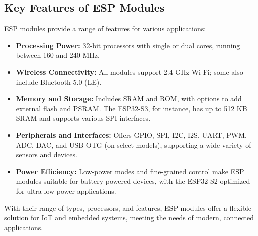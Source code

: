 \subsection{Key Features of ESP Modules}

ESP modules provide a range of features for various applications:

\begin{itemize}
	\item \textbf{Processing Power:} 32-bit processors with single or dual cores, running between 160 and 240 MHz.
	
	\item \textbf{Wireless Connectivity:} All modules support 2.4 GHz Wi-Fi; some also include Bluetooth 5.0 (LE).
	
	\item \textbf{Memory and Storage:} Includes SRAM and ROM, with options to add external flash and PSRAM. The ESP32-S3, for instance, has up to 512 KB SRAM and supports various SPI interfaces.
	
	\item \textbf{Peripherals and Interfaces:} Offers GPIO, SPI, I2C, I2S, UART, PWM, ADC, DAC, and USB OTG (on select models), supporting a wide variety of sensors and devices.
	
	\item \textbf{Power Efficiency:} Low-power modes and fine-grained control make ESP modules suitable for battery-powered devices, with the ESP32-S2 optimized for ultra-low-power applications.
\end{itemize}

With their range of types, processors, and features, ESP modules offer a flexible solution for IoT and embedded systems, meeting the needs of modern, connected applications.
